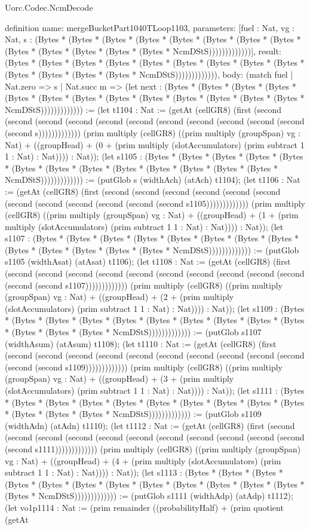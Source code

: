 \begin{lexlean}{Uorc.Codec.NcmDecode}
\begin{semanticmodule}
definition{
  name: mergeBucketPart1040TLoop1103,
  parameters: [fuel : Nat, vg : Nat, s : (Bytes * (Bytes * (Bytes * (Bytes * (Bytes * (Bytes * (Bytes * (Bytes * (Bytes * (Bytes * (Bytes * (Bytes * (Bytes * NcmDStS)))))))))))))],
  result: (Bytes * (Bytes * (Bytes * (Bytes * (Bytes * (Bytes * (Bytes * (Bytes * (Bytes * (Bytes * (Bytes * (Bytes * (Bytes * NcmDStS))))))))))))),
  body: (match fuel
    | Nat.zero => s
    | Nat.succ m => (let next : (Bytes * (Bytes * (Bytes * (Bytes * (Bytes * (Bytes * (Bytes * (Bytes * (Bytes * (Bytes * (Bytes * (Bytes * (Bytes * NcmDStS))))))))))))) := (let t1104 : Nat := (getAt (cellGR8) (first (second (second (second (second (second (second (second (second (second (second (second (second s))))))))))))) (prim multiply (cellGR8) ((prim multiply (groupSpan) vg : Nat) + ((groupHead) + (0 + (prim multiply (slotAccumulators) (prim subtract 1 1 : Nat) : Nat)))) : Nat)); (let s1105 : (Bytes * (Bytes * (Bytes * (Bytes * (Bytes * (Bytes * (Bytes * (Bytes * (Bytes * (Bytes * (Bytes * (Bytes * (Bytes * NcmDStS))))))))))))) := (putGlob s (widthAch) (atAch) t1104); (let t1106 : Nat := (getAt (cellGR8) (first (second (second (second (second (second (second (second (second (second (second (second (second s1105))))))))))))) (prim multiply (cellGR8) ((prim multiply (groupSpan) vg : Nat) + ((groupHead) + (1 + (prim multiply (slotAccumulators) (prim subtract 1 1 : Nat) : Nat)))) : Nat)); (let s1107 : (Bytes * (Bytes * (Bytes * (Bytes * (Bytes * (Bytes * (Bytes * (Bytes * (Bytes * (Bytes * (Bytes * (Bytes * (Bytes * NcmDStS))))))))))))) := (putGlob s1105 (widthAsat) (atAsat) t1106); (let t1108 : Nat := (getAt (cellGR8) (first (second (second (second (second (second (second (second (second (second (second (second (second s1107))))))))))))) (prim multiply (cellGR8) ((prim multiply (groupSpan) vg : Nat) + ((groupHead) + (2 + (prim multiply (slotAccumulators) (prim subtract 1 1 : Nat) : Nat)))) : Nat)); (let s1109 : (Bytes * (Bytes * (Bytes * (Bytes * (Bytes * (Bytes * (Bytes * (Bytes * (Bytes * (Bytes * (Bytes * (Bytes * (Bytes * NcmDStS))))))))))))) := (putGlob s1107 (widthAsum) (atAsum) t1108); (let t1110 : Nat := (getAt (cellGR8) (first (second (second (second (second (second (second (second (second (second (second (second (second s1109))))))))))))) (prim multiply (cellGR8) ((prim multiply (groupSpan) vg : Nat) + ((groupHead) + (3 + (prim multiply (slotAccumulators) (prim subtract 1 1 : Nat) : Nat)))) : Nat)); (let s1111 : (Bytes * (Bytes * (Bytes * (Bytes * (Bytes * (Bytes * (Bytes * (Bytes * (Bytes * (Bytes * (Bytes * (Bytes * (Bytes * NcmDStS))))))))))))) := (putGlob s1109 (widthAdn) (atAdn) t1110); (let t1112 : Nat := (getAt (cellGR8) (first (second (second (second (second (second (second (second (second (second (second (second (second s1111))))))))))))) (prim multiply (cellGR8) ((prim multiply (groupSpan) vg : Nat) + ((groupHead) + (4 + (prim multiply (slotAccumulators) (prim subtract 1 1 : Nat) : Nat)))) : Nat)); (let s1113 : (Bytes * (Bytes * (Bytes * (Bytes * (Bytes * (Bytes * (Bytes * (Bytes * (Bytes * (Bytes * (Bytes * (Bytes * (Bytes * NcmDStS))))))))))))) := (putGlob s1111 (widthAdp) (atAdp) t1112); (let vo1p1114 : Nat := (prim remainder ((probabilityHalf) + (prim quotient (getAt }
\end{semanticmodule}
\end{lexlean}
